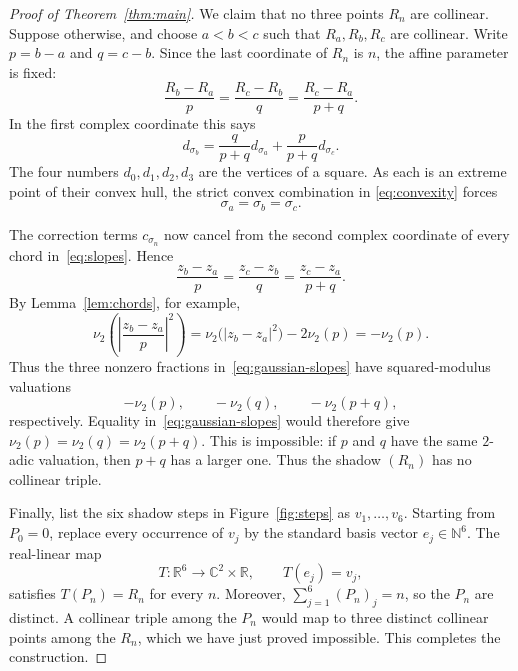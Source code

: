 \documentclass[10pt,reqno]{amsart}
\newcommand{\vTwo}{\nu_2}
\newcommand{\N}{\mathbb N}
\newcommand{\vTwo}{\nu_2}
\begin{document}
\begin{proof}[Proof of Theorem~\ref{thm:main}]
We claim that no three points $R_n$ are collinear.  Suppose otherwise, and
choose $a<b<c$ such that $R_a,R_b,R_c$ are collinear.  Write
$p=b-a$ and $q=c-b$.  Since the last coordinate of $R_n$ is $n$, the affine
parameter is fixed:
\begin{equation}\label{eq:slopes}
 \frac{R_b-R_a}{p}
 =\frac{R_c-R_b}{q}
 =\frac{R_c-R_a}{p+q}.
\end{equation}
In the first complex coordinate this says
\begin{equation}\label{eq:convexity}
 d_{\sigma_b}
 =\frac{q}{p+q}d_{\sigma_a}
  +\frac{p}{p+q}d_{\sigma_c}.
\end{equation}
The four numbers $d_0,d_1,d_2,d_3$ are the vertices of a square.  As each is
an extreme point of their convex hull, the strict convex combination in
\eqref{eq:convexity} forces
\begin{equation}\label{eq:equal-states}
 \sigma_a=\sigma_b=\sigma_c.
\end{equation}

The correction terms $c_{\sigma_n}$ now cancel from the second complex
coordinate of every chord in~\eqref{eq:slopes}.  Hence
\begin{equation}\label{eq:gaussian-slopes}
 \frac{z_b-z_a}{p}
 =\frac{z_c-z_b}{q}
 =\frac{z_c-z_a}{p+q}.
\end{equation}
By Lemma~\ref{lem:chords}, for example,
\[
 \vTwo\!\left(\left|\frac{z_b-z_a}{p}\right|^2\right)
 =\vTwo\bigl(|z_b-z_a|^2\bigr)-2\vTwo(p)=-\vTwo(p).
\]
Thus the three nonzero fractions in~\eqref{eq:gaussian-slopes} have
squared-modulus valuations
\begin{equation}\label{eq:slope-valuations}
 -\vTwo(p),\qquad -\vTwo(q),\qquad -\vTwo(p+q),
\end{equation}
respectively.  Equality in~\eqref{eq:gaussian-slopes} would therefore give
\(
 \vTwo(p)=\vTwo(q)=\vTwo(p+q).
\)
This is impossible: if $p$ and $q$ have the same $2$-adic valuation, then
$p+q$ has a larger one.  Thus the shadow $(R_n)$ has no collinear triple.

Finally, list the six shadow steps in Figure~\ref{fig:steps} as
$v_1,\ldots,v_6$.  Starting from $P_0=0$, replace every occurrence of $v_j$
by the standard basis vector $e_j\in\N^6$.  The real-linear map
\[
 T:\mathbb R^6\longrightarrow\mathbb C^2\times\mathbb R,
 \qquad T(e_j)=v_j,
\]
satisfies $T(P_n)=R_n$ for every $n$.  Moreover,
$\sum_{j=1}^6(P_n)_j=n$, so the $P_n$ are distinct.  A collinear triple among
the $P_n$ would map to three distinct collinear points among the $R_n$, which
we have just proved impossible.  This completes the construction.
\end{proof}
\end{document}
